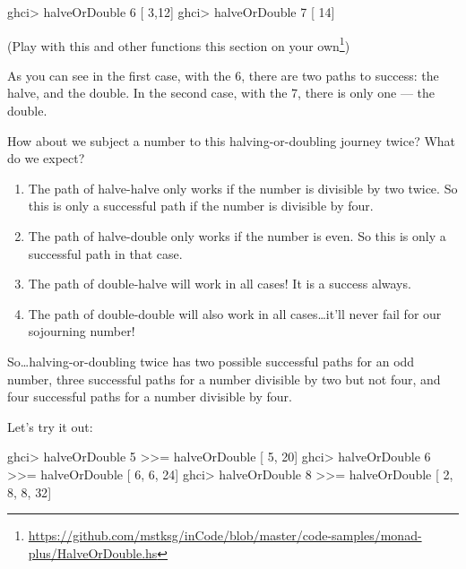 \documentclass[]{article}
\newenvironment{Shaded}{}{}
\newcommand{\DecValTok}[1]{\textcolor[rgb]{0.25,0.63,0.44}{#1}}
\newcommand{\NormalTok}[1]{#1}
\newcommand{\OperatorTok}[1]{\textcolor[rgb]{0.40,0.40,0.40}{#1}}
\renewcommand{\href}[2]{#2\footnote{\url{#1}}}
\begin{document}
\begin{Shaded}
\begin{Highlighting}[]
\NormalTok{ghci}\OperatorTok{\textgreater{}}\NormalTok{ halveOrDouble }\DecValTok{6}
\NormalTok{[ }\DecValTok{3}\NormalTok{,}\DecValTok{12}\NormalTok{]}
\NormalTok{ghci}\OperatorTok{\textgreater{}}\NormalTok{ halveOrDouble }\DecValTok{7}
\NormalTok{[   }\DecValTok{14}\NormalTok{]}
\end{Highlighting}
\end{Shaded}

(\href{https://github.com/mstksg/inCode/blob/master/code-samples/monad-plus/HalveOrDouble.hs}{Play
with this and other functions this section on your own})

As you can see in the first case, with the 6, there are two paths to success:
the halve, and the double. In the second case, with the 7, there is only one ---
the double.

How about we subject a number to this halving-or-doubling journey twice? What do
we expect?

\begin{enumerate}
\def\labelenumi{\arabic{enumi}.}
\tightlist
\item
  The path of halve-halve only works if the number is divisible by two twice. So
  this is only a successful path if the number is divisible by four.
\item
  The path of halve-double only works if the number is even. So this is only a
  successful path in that case.
\item
  The path of double-halve will work in all cases! It is a success always.
\item
  The path of double-double will also work in all cases\ldots it'll never fail
  for our sojourning number!
\end{enumerate}

So\ldots halving-or-doubling twice has two possible successful paths for an odd
number, three successful paths for a number divisible by two but not four, and
four successful paths for a number divisible by four.

Let's try it out:

\begin{Shaded}
\begin{Highlighting}[]
\NormalTok{ghci}\OperatorTok{\textgreater{}}\NormalTok{ halveOrDouble }\DecValTok{5} \OperatorTok{\textgreater{}\textgreater{}=}\NormalTok{ halveOrDouble}
\NormalTok{[       }\DecValTok{5}\NormalTok{, }\DecValTok{20}\NormalTok{]}
\NormalTok{ghci}\OperatorTok{\textgreater{}}\NormalTok{ halveOrDouble }\DecValTok{6} \OperatorTok{\textgreater{}\textgreater{}=}\NormalTok{ halveOrDouble}
\NormalTok{[    }\DecValTok{6}\NormalTok{, }\DecValTok{6}\NormalTok{, }\DecValTok{24}\NormalTok{]}
\NormalTok{ghci}\OperatorTok{\textgreater{}}\NormalTok{ halveOrDouble }\DecValTok{8} \OperatorTok{\textgreater{}\textgreater{}=}\NormalTok{ halveOrDouble}
\NormalTok{[ }\DecValTok{2}\NormalTok{, }\DecValTok{8}\NormalTok{, }\DecValTok{8}\NormalTok{, }\DecValTok{32}\NormalTok{]}
\end{Highlighting}
\end{Shaded}
\end{document}
